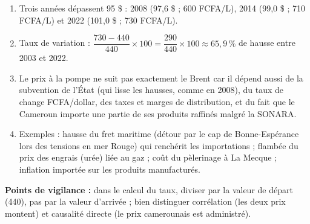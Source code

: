 \documentclass[11pt]{article}
\begin{document}
\begin{corrige}
\begin{enumerate}
    \item Trois années dépassent 95 \$ : 2008 (97,6 \$ ; 600 FCFA/L), 2014 (99,0 \$ ; 710 FCFA/L) et 2022 (101,0 \$ ; 730 FCFA/L).
    \item Taux de variation : $\dfrac{730 - 440}{440} \times 100 = \dfrac{290}{440} \times 100 \approx 65,9\,\%$ de hausse entre 2003 et 2022.
    \item Le prix à la pompe ne suit pas exactement le Brent car il dépend aussi de la subvention de l'État (qui lisse les hausses, comme en 2008), du taux de change FCFA/dollar, des taxes et marges de distribution, et du fait que le Cameroun importe une partie de ses produits raffinés malgré la SONARA.
    \item Exemples : hausse du fret maritime (détour par le cap de Bonne-Espérance lors des tensions en mer Rouge) qui renchérit les importations ; flambée du prix des engrais (urée) liée au gaz ; coût du pèlerinage à La Mecque ; inflation importée sur les produits manufacturés.
\end{enumerate}
\textbf{Points de vigilance :} dans le calcul du taux, diviser par la valeur de départ (440), pas par la valeur d'arrivée ; bien distinguer corrélation (les deux prix montent) et causalité directe (le prix camerounais est administré).
\end{corrige}
\end{document}
